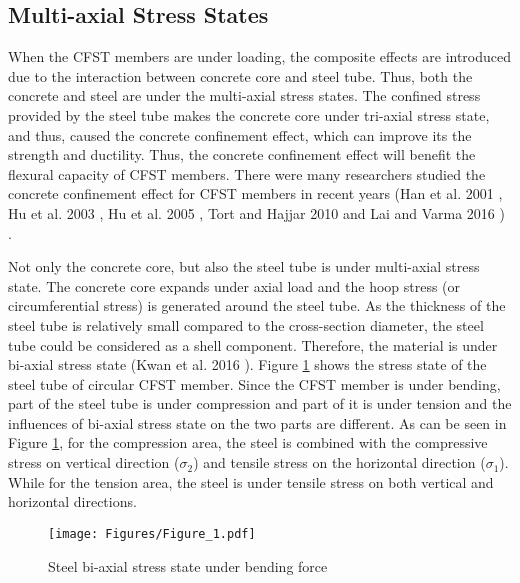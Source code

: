 \documentclass[12pt,a4]{article}
\begin{document}
	\subsection{Multi-axial Stress States}
	When the CFST members are under loading, the composite effects are introduced due to the interaction between concrete core and steel tube. Thus, both the concrete and steel are under the multi-axial stress states. The confined stress provided by the steel tube makes the concrete core under tri-axial stress state, and thus, caused the concrete confinement effect, which can improve its the strength and ductility. Thus, the concrete confinement effect will benefit the flexural capacity of CFST members. There were many researchers studied the concrete confinement effect for CFST members in recent years (Han et al. 2001 \cite{RN23}, Hu et al. 2003 \cite{RN1}, Hu et al. 2005 \cite{RN29}, Tort and Hajjar 2010 \cite{RN46} and Lai and Varma 2016 \cite{RN32}) .
	\par
	Not only the concrete core, but also the steel tube is under multi-axial stress state. The concrete core expands under axial load and the hoop stress (or circumferential stress) is generated around the steel tube. As the thickness of the steel tube is relatively small compared to the cross-section diameter, the steel tube could be considered as a shell component. Therefore, the material is under bi-axial stress state (Kwan et al. 2016 \cite{RN31}). Figure \ref{fig:1} shows the stress state of the steel tube of circular CFST member. Since the CFST member is under bending, part of the steel tube is under compression and part of it is under tension and the influences of bi-axial stress state on the two parts are different. As can be seen in Figure \ref{fig:1}, for the compression area, the steel is combined with the compressive stress on vertical direction ($\sigma_2$) and tensile stress on the horizontal direction ($\sigma_1$). While for the tension area, the steel is under tensile stress on both vertical and horizontal directions.
	\par
	\begin{figure}[h]
		\centering
		\texttt{[image: Figures/Figure\_1.pdf]}
		\caption{Steel bi-axial stress state under bending force}
		\label{fig:1}
	\end{figure}
	\par
\end{document}
